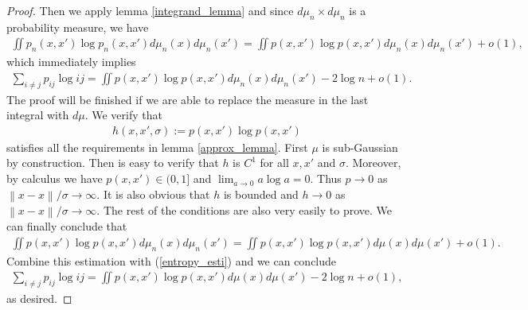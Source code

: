 \documentclass[10pt]{article}
\newcommand{\norm}[1]{\left\lVert#1\right\rVert}
\newenvironment{Proof of lemma}{\noindent{\bf Proof of Lemma}}{\hfill$\Box$\newline}
\newenvironment{Proof of claim}{\noindent{\bf Proof of claim}}{\hfill$\Box$\newline}
\newenvironment{Proof of theorem}{\noindent{\bf Proof of Theorem}}{\hfill\scriptsize{$\Box$}\newline}
\newenvironment{Proof of theorems}{\noindent{\bf Proof of Theorems}}{\hfill$\Box$\newline}
\newenvironment{Proof of proposition}{\noindent{\bf Proof of Proposition}}{\hfill$\Box$\newline}
\newenvironment{Proof of propositions}{\noindent{\bf Proof of Propositions}}{\hfill$\Box$\newline}
\newenvironment{Proof of exercise}{\noindent{\it Proof of Exercise:}}{\hfill$\Box$}
\numberwithin{equation}{section}
\begin{document}
\begin{proof}
    Then we apply lemma \ref{integrand_lemma} and since $d \mu_n \times d \mu_n$ is
    a probability measure, we have
    \begin{align}
        \iint p_n(x,x')\log p_n(x,x') d\mu_n(x)d\mu_n(x') = \iint p(x,x')\log p(x,x') d\mu_n(x)d\mu_n(x') +o(1),
    \end{align}
    which immediately implies
    \begin{align} \label{entropy_esti}
        \sum_{i \neq j}p_{ij} \log{ij} = \iint p(x,x')\log p(x,x') d\mu_n(x)d\mu_n(x') -2 \log n + o(1).
    \end{align}
    The proof will be finished if we are able to replace the measure in the last integral with $d \mu$. We verify that
    \begin{align}
        h(x,x',\sigma) :=  p(x,x')\log p(x,x')
    \end{align}
    satisfies all the requirements in lemma \ref{approx_lemma}. First $\mu$ is sub-Gaussian by construction. Then is easy to verify that $h$ is $C^1$ for all $x,x'$ and $\sigma$. Moreover, by calculus we have $p(x,x') \in (0,1]$ and $\lim_{a \to 0} a \log a = 0$. Thus $p \to 0$ as $\norm{x-x}/\sigma \to \infty$. It is also obvious that $h$ is bounded and $h \to 0$ as $\norm{x-x}/\sigma \to \infty$. The rest of the conditions are also very easily to prove. We can finally conclude that
    \begin{align}
        \iint p(x,x')\log p(x,x') d\mu_n(x)d\mu_n(x') = \iint p(x,x')\log p(x,x') d\mu(x)d\mu(x') + o(1).
    \end{align}
    Combine this estimation with (\ref{entropy_esti}) and we can conclude
    \begin{align}
        \sum_{i \neq j}p_{ij} \log{ij} = \iint p(x,x')\log p(x,x') d\mu(x)d\mu(x') - 2\log n + o(1),
    \end{align}
    as desired.
\end{proof}
\end{document}
